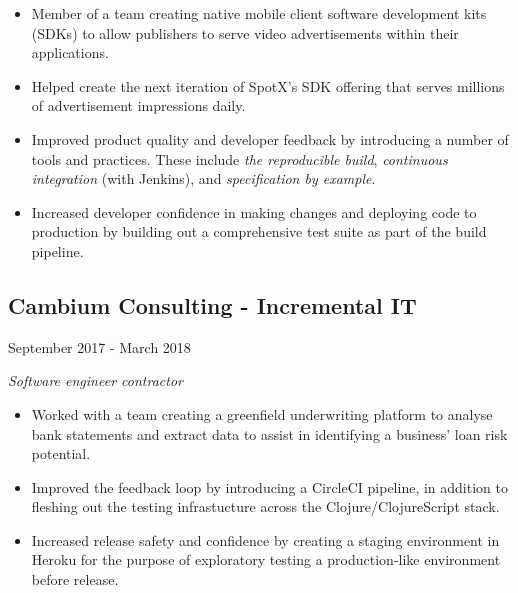 \begin{itemize}
\item Member of a team creating native mobile client software development kits
  (SDKs) to allow publishers to serve video advertisements within their
  applications.

\item Helped create the next iteration of SpotX's SDK offering that serves
  millions of advertisement impressions daily.

\item Improved product quality and developer feedback by introducing a number of
  tools and practices. These include \emph{the reproducible build},
  \emph{continuous integration} (with Jenkins), and \emph{specification by
    example}.

\item Increased developer confidence in making changes and deploying code to
  production by building out a comprehensive test suite as part of the build
  pipeline.
\end{itemize}

\begin{minipage}[t]{0.6\textwidth}
  \subsection*{Cambium Consulting - Incremental IT}
\end{minipage}
\noindent\begin{minipage}[t]{0.4\textwidth}
  \flushright
  September 2017 - March 2018
\end{minipage}

\emph{Software engineer contractor}

\begin{itemize}
\item Worked with a team creating a greenfield underwriting platform to
  analyse bank statements and extract data to assist in identifying a business'
  loan risk potential.

\item Improved the feedback loop by introducing a CircleCI pipeline, in addition
  to fleshing out the testing infrastucture across the Clojure/ClojureScript
  stack.

\item Increased release safety and confidence by creating a staging environment
  in Heroku for the purpose of exploratory testing a production-like environment
  before release.
\end{itemize}

